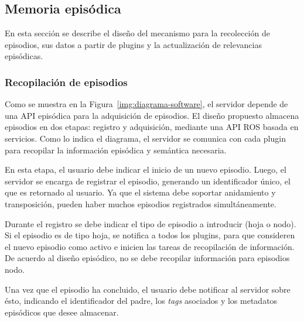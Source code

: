 \subsection{Memoria episódica}

En esta sección se describe el diseño del mecanismo para la recolección de episodios, sus datos a partir de plugins y la actualización de relevancias episódicas.

\subsubsection{Recopilación de episodios}

Como se muestra en la Figura~\ref{img:diagrama-software}, el servidor depende de una API episódica para la adquisición de episodios. El diseño propuesto almacena episodios en dos etapas: registro y adquisición, mediante una API ROS basada en servicios. Como lo indica el diagrama, el servidor se comunica con cada plugin para recopilar la información episódica y semántica necesaria.

En esta etapa, el usuario debe indicar el inicio de un nuevo episodio. Luego, el servidor se encarga de registrar el episodio, generando un identificador único, el que es retornado al usuario. Ya que el sistema debe soportar anidamiento y transposición, pueden haber muchos episodios registrados simultáneamente. 

Durante el registro se debe indicar el tipo de episodio a introducir (hoja o nodo). Si el episodio es de tipo hoja, se notifica a todos los plugins, para que consideren el nuevo episodio como activo e inicien las tareas de recopilación de información. De acuerdo al diseño episódico, no se debe recopilar información para episodios nodo.

Una vez que el episodio ha concluido, el usuario debe notificar al servidor sobre ésto, indicando el identificador del padre, los \textit{tags} asociados y los metadatos episódicos que desee almacenar.

